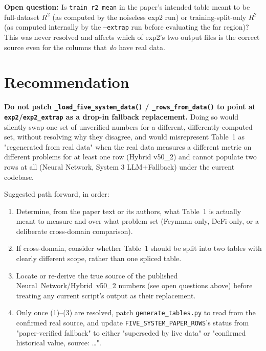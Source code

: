 \documentclass[11pt]{article}
\newcommand{\open}[1]{\par\noindent\textbf{\textcolor{orange!80!black}{Open question: }}#1\par}
\newcommand{\code}[1]{\texttt{#1}}
\begin{document}
\open{Is \code{train\_r2\_mean} in the paper's intended table meant to be
full-dataset $R^2$ (as computed by the noiseless exp2 run) or
training-split-only $R^2$ (as computed internally by the \code{--extrap}
run before evaluating the far region)? This was never resolved and affects
which of exp2's two output files is the correct source even for the columns
that \emph{do} have real data.}

\section{Recommendation}

\textbf{Do not patch \code{\_load\_five\_system\_data()} /
\code{\_rows\_from\_data()} to point at \code{exp2}/\code{exp2\_extrap}
as a drop-in fallback replacement.} Doing so would silently swap one set
of unverified numbers for a different, differently-computed set, without
resolving why they disagree, and would misrepresent Table~1 as
"regenerated from real data" when the real data measures a different
metric on different problems for at least one row (Hybrid v50\_2) and
cannot populate two rows at all (Neural Network, System 3 LLM+Fallback)
under the current codebase.

Suggested path forward, in order:
\begin{enumerate}
  \item Determine, from the paper text or its authors, what Table~1 is
        actually meant to measure and over what problem set (Feynman-only,
        DeFi-only, or a deliberate cross-domain comparison).
  \item If cross-domain, consider whether Table~1 should be split into two
        tables with clearly different scope, rather than one spliced table.
  \item Locate or re-derive the true source of the published
        Neural~Network/Hybrid~v50\_2 numbers (see open questions above)
        before treating any current script's output as their replacement.
  \item Only once (1)--(3) are resolved, patch \code{generate\_tables.py}
        to read from the confirmed real source, and update
        \code{FIVE\_SYSTEM\_PAPER\_ROWS}'s status from "paper-verified
        fallback" to either "superseded by live data" or "confirmed
        historical value, source: \ldots".
\end{enumerate}
\end{document}
